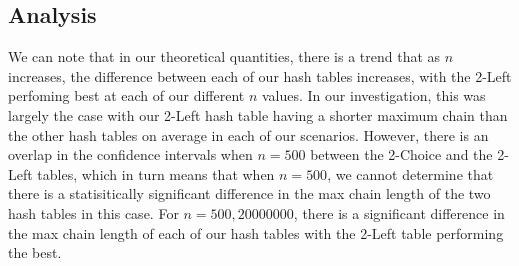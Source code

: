 \documentclass[11pt]{article}
\begin{document}
\vspace{-6mm}
\subsection*{Analysis}
We can note that in our theoretical quantities, there is a trend that as $n$ increases, the difference between each of our hash tables increases, with the 2-Left perfoming best at each of our different $n$ values.
In our investigation, this was largely the case with our 2-Left hash table having a shorter maximum chain than the other hash tables on average in each of our scenarios. However, there is an overlap in the confidence intervals when $n=500$ between the 2-Choice and the 2-Left tables, which
in turn means that when $n = 500$, we cannot determine that there is a statisitically significant difference in the max chain length of the two hash tables in this case. For $n = 500, 20000000$,
there is a significant difference in the max chain length of each of our hash tables with the 2-Left table performing the best.
\end{document}
